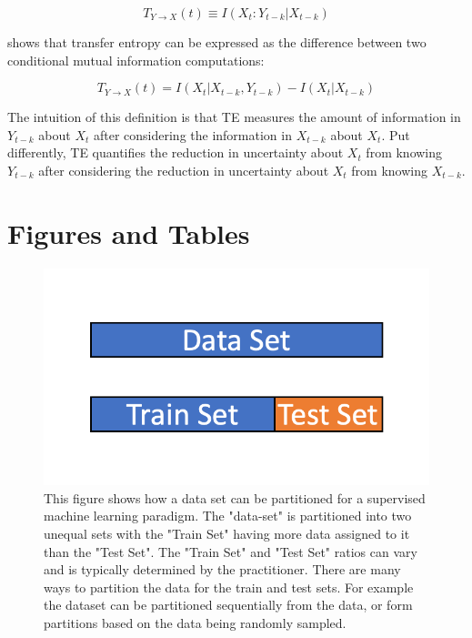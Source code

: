 \begin{equation}
T_{Y \rightarrow X} (t) \equiv I(X_t: Y_{t-k} |  X_{t-k})
\end{equation}

\noindent \cite{kraskovEstimator} shows that transfer entropy can be expressed as the difference between two conditional mutual information computations: 

\begin{equation}  \label{eq:TE-MI-Diff}
T_{Y \rightarrow X}(t) = I(X_t | X_{t-k}, Y_{t-k}) -  I(X_t | X_{t-k}) 
 \end{equation} 

The intuition of this definition is that TE measures the amount of information in \(Y_{t-k}\) about \(X_t\) after  considering the information in \(X_{t-k}\) about \(X_t\). Put differently, TE quantifies the reduction in uncertainty about \(X_t\) from knowing \(Y_{t-k}\) after considering the reduction in uncertainty about \(X_t\) from knowing \(X_{t-k}\).

\clearpage

\section{Figures and Tables}

\begin{figure}[!htb]
    \centering
      \centering
      \includegraphics[width=\textwidth]{figures/ppt/TrainTestSplit.png}
    \caption{
      This figure shows how a data set can be partitioned for a supervised machine learning paradigm. The "data-set" is partitioned into two unequal sets with the "Train Set" having more data assigned to it than the "Test Set".  The "Train Set" and "Test Set" ratios can vary and is typically determined by the practitioner. There are many ways to partition the data for the train and test sets. For example the dataset can be partitioned sequentially from the data, or form partitions based on the data being randomly sampled.
      }
\label{fig:TrainTestSplit}

  \end{figure}


